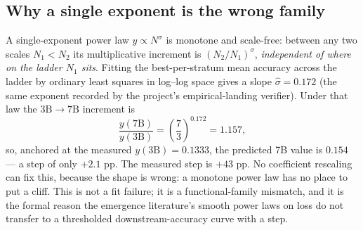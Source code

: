 \documentclass[11pt,a4paper]{article}
\begin{document}
\subsection{Why a single exponent is the wrong family}
A single-exponent power law \(y \propto N^{\sigma}\) is monotone and
scale-free: between any two scales \(N_1 < N_2\) its multiplicative
increment is \((N_2/N_1)^{\sigma}\), \emph{independent of where on the ladder
\(N_1\) sits}. Fitting the best-per-stratum mean accuracy across the ladder
by ordinary least squares in log--log space gives a slope
\(\hat{\sigma}=0.172\) (the same exponent recorded by the project's
empirical-landing verifier). Under that law the \(3\text{B}\to 7\text{B}\)
increment is
\begin{equation}
  \frac{y(7\text{B})}{y(3\text{B})} = \left(\frac{7}{3}\right)^{0.172}
    = 1.157,
\end{equation}
so, anchored at the measured \(y(3\text{B})=0.1333\), the predicted 7B value
is \(0.154\) --- a step of only \(+2.1\) pp. The measured step is
\(+43\) pp. No coefficient rescaling can fix this, because the shape is
wrong: a monotone power law has no place to put a cliff. This is not a fit
failure; it is a functional-family mismatch, and it is the formal reason the
emergence literature's smooth power laws on loss
\citep{kaplan2020scaling,hoffmann2022chinchilla} do not transfer to a
thresholded downstream-accuracy curve with a step.
\end{document}
